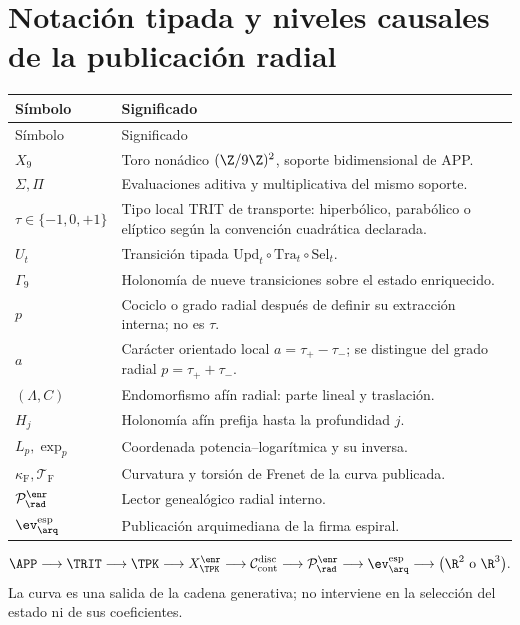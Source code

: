\part{Notación tipada y niveles causales de la publicación radial}
\begin{longtable}{>{\raggedright\arraybackslash}p{}p{}}
\toprule
Símbolo & Significado\\
\midrule
\endfirsthead
\toprule
Símbolo & Significado\\
\midrule
\endhead
\(X_9\) & Toro nonádico \((\Z/9\Z)^2\), soporte bidimensional de APP.\\
\(\Sigma,\Pi\) & Evaluaciones aditiva y multiplicativa del mismo soporte.\\
\(\tau\in\{-1,0,+1\}\) & Tipo local TRIT de transporte: hiperbólico, parabólico o elíptico según la convención cuadrática declarada.\\
\(U_t\) & Transición tipada \(\mathrm{Upd}_t\circ\mathrm{Tra}_t\circ\mathrm{Sel}_t\).\\
\(\Gamma_9\) & Holonomía de nueve transiciones sobre el estado enriquecido.\\
\(p\) & Cociclo o grado radial después de definir su extracción interna; no es \(\tau\).\\
\(a\) & Carácter orientado local \(a=\tau_+-\tau_-\); se distingue del grado radial \(p=\tau_++\tau_-\).\\
\((\Lambda,C)\) & Endomorfismo afín radial: parte lineal y traslación.\\
\(H_j\) & Holonomía afín prefija hasta la profundidad \(j\).\\
\(L_p,\exp_p\) & Coordenada potencia--logarítmica y su inversa.\\
\(\kappa_{\mathrm{F}},\mathcal T_{\mathrm{F}}\) & Curvatura y torsión de Frenet de la curva publicada.\\
\(\mathcal P^{\enr}_{\rad}\) & Lector genealógico radial interno.\\
\(\ev_{\arq}^{\mathrm{esp}}\) & Publicación arquimediana de la firma espiral.\\
\bottomrule
\end{longtable}

\begin{resultbox}[title={Composición causal desde APP--TRIT--TPK hasta la evaluación arquimediana radial}]
\[
\APP\longrightarrow\TRIT\longrightarrow\TPK
\longrightarrow X_{\TPK}^{\enr}
\longrightarrow\mathcal C_{\mathrm{cont}}^{\mathrm{disc}}
\longrightarrow\mathcal P_{
  \rad}^{\enr}
\longrightarrow\ev_{\arq}^{\mathrm{esp}}
\longrightarrow\bigl(\R^2\ \text{o}\ \R^3\bigr).
\]
La curva es una salida de la cadena generativa; no interviene en la selección
del estado ni de sus coeficientes.
\end{resultbox}
